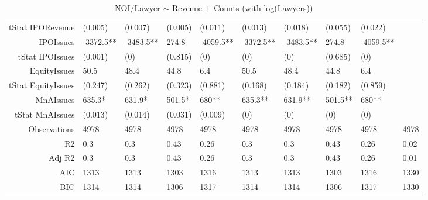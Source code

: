 \begin{table}[ht]
\begin{tabular}{rlllllllll}
  tStat IPORevenue & (0.005) & (0.007) & (0.005) & (0.011) & (0.013) & (0.018) & (0.055) & (0.022) &  \\ 
  IPOIssues & -3372.5** & -3483.5** & 274.8 & -4059.5** & -3372.5** & -3483.5** & 274.8 & -4059.5** &  \\ 
  tStat IPOIssues & (0.001) & (0) & (0.815) & (0) & (0) & (0) & (0.685) & (0) &  \\ 
  EquityIssues & 50.5 & 48.4 & 44.8 & 6.4 & 50.5 & 48.4 & 44.8 & 6.4 &  \\ 
  tStat EquityIssues & (0.247) & (0.262) & (0.323) & (0.881) & (0.168) & (0.184) & (0.182) & (0.859) &  \\ 
  MnAIssues & 635.3* & 631.9* & 501.5* & 680** & 635.3** & 631.9** & 501.5** & 680** &  \\ 
  tStat MnAIssues & (0.013) & (0.014) & (0.031) & (0.009) & (0) & (0) & (0) & (0) &  \\ 
  Observations & 4978 & 4978 & 4978 & 4978 & 4978 & 4978 & 4978 & 4978 & 4978 \\ 
  R2 & 0.3 & 0.3 & 0.43 & 0.26 & 0.3 & 0.3 & 0.43 & 0.26 & 0.02 \\ 
  Adj R2 & 0.3 & 0.3 & 0.43 & 0.26 & 0.3 & 0.3 & 0.43 & 0.26 & 0.01 \\ 
  AIC & 1313 & 1313 & 1303 & 1316 & 1313 & 1313 & 1303 & 1316 & 1330 \\ 
  BIC & 1314 & 1314 & 1306 & 1317 & 1314 & 1314 & 1306 & 1317 & 1330 \\ 
   \hline
\end{tabular}
\caption{NOI/Lawyer $\sim$ Revenue + Counts (with log(Lawyers))} 
\end{table}
